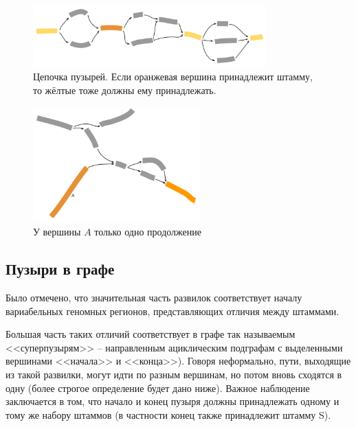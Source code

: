 \documentclass{spbau-diploma}
\begin{document}
\begin{figure}[t]
\centering
\includegraphics[width=0.8\textwidth]{pics/bubbles_chain.png}
\caption{Цепочка пузырей. Если оранжевая вершина принадлежит штамму, то жёлтые тоже должны ему принадлежать.}
\label{bubbles_chain}
\end{figure}


\begin{figure}[t]
\centering
\includegraphics[width=0.57\textwidth]{pics/one_continue.png}
\caption{У вершины $A$ только одно продолжение}
\label{one_continue}
\end{figure}


\subsection{Пузыри в графе}

Было отмечено, что значительная часть развилок соответствует началу вариабельных геномных регионов, представляющих отличия между штаммами.

Большая часть таких отличий соответствует в графе так называемым <<суперпузырям>> -- направленным ациклическим подграфам с выделенными вершинами <<начала>> и <<конца>>). Говоря неформально, пути, выходящие из такой развилки, могут идти по разным вершинам, но потом вновь сходятся в одну (более строгое определение будет дано ниже). Важное наблюдение заключается в том, что начало и конец пузыря должны принадлежать одному и тому же набору штаммов (в частности конец также принадлежит штамму S). 
\end{document}
